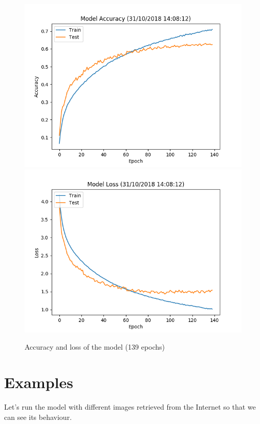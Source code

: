 \documentclass[12pt,english]{article}
\begin{document}
\begin{figure}[H]
\centering
\includegraphics[scale=0.85]{accuracy_139.png}
\includegraphics[scale=0.85]{loss_139.png}
\caption{Accuracy and loss of the model (139 epochs)}
\end{figure}


\section{Examples}
Let's run the model with different images retrieved from the Internet so that we can see its behaviour.
\end{document}
